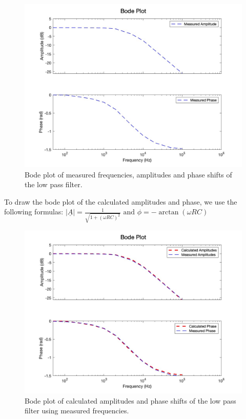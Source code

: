 \begin{figure}[H]
    \centering
    \includegraphics[scale=0.3]{images/bode_plot_low_pass_measured.jpg}
    \caption{Bode plot of measured frequencies, amplitudes and phase shifts of the low pass filter.}
\end{figure}

To draw the bode plot of the calculated amplitudes and phase, we use the following formulas:
$|\underline{A}| = \frac{1}{\sqrt{1 + (\omega RC)^2}} \text{ and } \phi = -\arctan(\omega RC)$


\begin{figure}[H]
    \centering
    \includegraphics[scale=0.3]{images/bode_plot_low_pass_calculated.jpg}
    \caption{Bode plot of calculated amplitudes and phase shifts of the low pass filter using measured frequencies.}
\end{figure}




